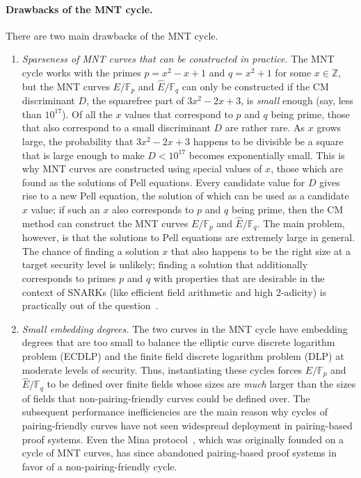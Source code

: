 \documentclass[version=preprint]{iacrcc}
\newcommand{\Z}{\mathbb{Z}}
\newcommand{\F}{\mathbb{F}}
\begin{document}
\paragraph{Drawbacks of the MNT cycle.} There are two main drawbacks of the MNT cycle.
\begin{enumerate}
\item \emph{Sparseness of MNT curves that can be constructed in practice.} The MNT cycle works with the primes $p=x^2-x+1$ and $q=x^2+1$ for some $x \in \Z$, but the MNT curves $E/\F_p$ and $\hat{E}/\F_q$ can only be constructed if the CM discriminant $D$, the squarefree part of $3x^2-2x+3$, is \emph{small} enough (say, less than $10^{17}$). Of all the $x$ values that correspond to $p$ and $q$ being prime, those that also correspond to a small discriminant $D$ are rather rare. As $x$ grows large, the probability that $3x^2-2x+3$ happens to be divisible be a square that is large enough to make $D<10^{17}$ becomes exponentially small. This is why MNT curves are constructed using special values of $x$, those which are found as the solutions of Pell equations. Every candidate value for $D$ gives rise to a new Pell equation, the solution of which can be used as a candidate $x$ value; if such an $x$ also corresponds to $p$ and $q$ being prime, then the CM method can construct the MNT curves $E/\F_p$ and $\hat{E}/\F_q$. The main problem, however, is that the solutions to Pell equations are extremely large in general. The chance of finding a solution $x$ that also happens to be the right size at a target security level is unlikely; finding a solution that additionally corresponds to primes $p$ and $q$ with properties that are desirable in the context of SNARKs (like efficient field arithmetic and high $2$-adicity) is practically out of the question~\cite[\S 3.2]{scalable}.

\item \emph{Small embedding degrees.}  The two curves in the MNT cycle have embedding degrees that are too small to balance the elliptic curve discrete logarithm problem (ECDLP) and the finite field discrete logarithm problem (DLP) at moderate levels of security. Thus, instantiating these cycles forces $E/\F_p$ and $\hat{E}/\F_q$ to be defined over finite fields whose sizes are \emph{much} larger than the sizes of fields that non-pairing-friendly curves could be defined over. The subsequent performance inefficiencies are the main reason why cycles of pairing-friendly curves have not seen widespread deployment in pairing-based proof systems. Even the Mina protocol~\cite{mina}, which was originally founded on a cycle of MNT curves, has since abandoned pairing-based proof systems in favor of a non-pairing-friendly cycle. 


\end{enumerate}
\end{document}
